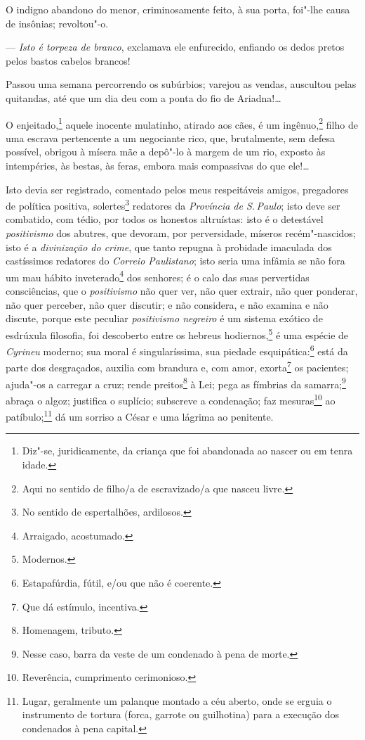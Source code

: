 O indigno abandono do menor, criminosamente feito, à sua porta, foi"-lhe
causa de insônias; revoltou"-o.

--- \emph{Isto é torpeza de branco}, exclamava ele enfurecido, enfiando
os dedos pretos pelos bastos cabelos brancos!

Passou uma semana percorrendo os subúrbios; varejou as vendas, auscultou
pelas quitandas, até que um dia deu com a ponta do fio de Ariadna!\ldots{}

O enjeitado,\footnote{Diz"-se, juridicamente, da criança que foi
  abandonada ao nascer ou em tenra idade.} aquele inocente mulatinho,
atirado aos cães, é um ingênuo,\footnote{Aqui no sentido de filho/a de
  escravizado/a que nasceu livre.} filho de uma escrava pertencente a
um negociante rico, que, brutalmente, sem defesa possível, obrigou à
mísera mãe a depô"-lo à margem de um rio, exposto às intempéries, às
bestas, às feras, embora mais compassivas do que ele!\ldots{}

Isto devia ser registrado, comentado pelos meus respeitáveis amigos,
pregadores de política positiva, solertes\footnote{No sentido de
  espertalhões, ardilosos.} redatores da \emph{Província de S.\,Paulo};
isto deve ser combatido, com tédio, por todos os honestos altruístas:
isto é o detestável \emph{positivismo} dos abutres, que devoram, por
perversidade, míseros recém"-nascidos; isto é a \emph{divinização do
crime}, que tanto repugna à probidade imaculada dos castíssimos
redatores do \emph{Correio Paulistano}; isto seria uma infâmia se não
fora um mau hábito inveterado\footnote{Arraigado, acostumado.} dos
senhores; é o calo das suas pervertidas consciências, que o
\emph{positivismo} não quer ver, não quer extrair, não quer ponderar,
não quer perceber, não quer discutir; e não considera, e não examina e
não discute, porque este peculiar \emph{positivismo negreiro} é um
sistema exótico de esdrúxula filosofia, foi descoberto entre os hebreus
hodiernos,\footnote{Modernos.} é uma espécie de \emph{Cyrineu}
moderno; sua moral é singularíssima, sua piedade esquipática:\footnote{
  Estapafúrdia, fútil, e/ou que não é coerente.} está da parte dos
desgraçados, auxilia com brandura e, com amor, exorta\footnote{Que dá
  estímulo, incentiva.} os pacientes; ajuda"-os a carregar a cruz; rende
preitos\footnote{Homenagem, tributo.} à Lei; pega as fímbrias da
samarra;\footnote{Nesse caso, barra da veste de um condenado à pena de
  morte.} abraça o algoz; justifica o suplício; subscreve a condenação;
faz mesuras\footnote{Reverência, cumprimento cerimonioso.} ao
patíbulo;\footnote{Lugar, geralmente um palanque montado a céu aberto,
  onde se erguia o instrumento de tortura (forca, garrote ou guilhotina)
  para a execução dos condenados à pena capital.}
dá um sorriso a César e uma
lágrima ao penitente.

